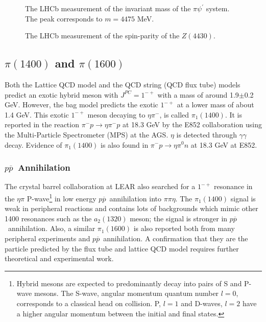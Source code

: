 \documentclass[aps,prd,twocolumn,nofootinbib]{revtex4-1}
\begin{document}
\begin{figure}[H]
  \centerline{}
  \caption{The LHCb measurement of the invariant mass of the $\pi\psi^{\prime}$ system. The peak corresponds to $m=4475$ MeV.}
  \label{fig:z4430lhcb1}
\end{figure}

 \begin{figure}[H]
  \centerline{}
  \caption{The LHCb measurement of the spin-parity of the $Z(4430)$.}
  \label{fig:z4430lhcb2}
 \end{figure}


\subsection{$\pi(1400)$ and $\pi(1600)$}

Both the Lattice QCD model and the QCD string (QCD flux tube) models predict an exotic hybrid meson with $J^{PC} = 1^{-+}$ with a mass of around 1.9$\pm$0.2 GeV. However, the bag model predicts the exotic $1^{-+}$ at a lower mass of about 1.4 GeV. This exotic $1^{-+}$ meson decaying to $\eta \pi^{-}$, is called $\pi_{1}(1400)$. It is reported in the reaction $\pi^{-}p \rightarrow \eta \pi^{-}p$ at 18.3 GeV by the E852 collaboration using the Multi-Particle Spectrometer (MPS) at the AGS. $\eta$ is detected through $\gamma \gamma$ decay. Evidence of $\pi_{1}(1400)$ is also found in $\pi^{-}p \rightarrow \eta \pi^{0} n$ at 18.3 GeV at E852.

\subsubsection{$p\overline{p}$~Annihilation}

The crystal barrel collaboration at LEAR also searched for a $1^{−+}$ resonance in the $\eta \pi$ P-wave\footnote{Hybrid mesons are expected to predominantly decay into pairs of S and P-wave mesons. The S-wave, angular momentum quantum number $l=0$, corresponds to a classical head on collision. P, $l=1$ and D-waves, $l=2$ have a higher angular momentum between the initial and final states.} in low energy $p\overline{p}$~annihilation into $\pi\pi\eta$. The $\pi_{1}(1400)$ signal is weak in peripheral reactions and contains lots of backgrounds which mimic other 1400 resonances such as the $a_{2}(1320)$ meson; the signal is stronger in $p\overline{p}$~annihilation. Also, a similar $\pi_{1}(1600)$ is also reported both from many peripheral experiments and $p\overline{p}$~annihilation. A confirmation that they are the particle predicted by the flux tube and lattice QCD model requires further theoretical and experimental work.
\end{document}
